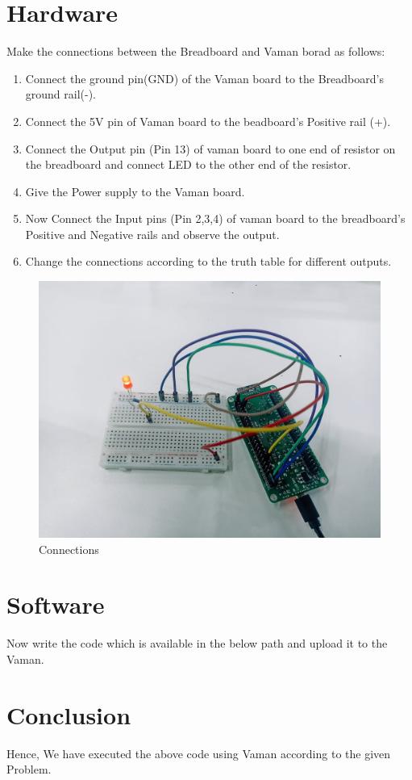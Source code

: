 \documentclass[10pt,a4paper]{article}
\begin{document}
    \section{Hardware}
    Make the connections between the Breadboard and Vaman borad as follows:
    \begin{enumerate}
    	\item Connect the ground pin(GND) of the Vaman board to the Breadboard's ground rail(-).
 	\item Connect the 5V pin of Vaman board to the beadboard's Positive rail (+).
    	\item Connect the Output pin (Pin 13) of vaman board to one end of resistor on the breadboard and connect LED to the other end of the resistor.
    	\item Give the Power supply to the Vaman board.
    	\item Now Connect the Input pins (Pin 2,3,4) of vaman board to the breadboard's Positive and Negative rails and observe the output.
    	\item Change the connections according to the truth table for different outputs.
    \end{enumerate}
	    \begin{figure}[H]
		    \centering
		    \includegraphics[width=0.3\columnwidth]{iot.jpg}
		    \caption{Connections}
		    \label{fig:connections}
	    \end{figure}
\section{Software}
	Now write the code which is available in the below path and upload it to the Vaman. \\
\section{Conclusion}
	Hence, We have executed the above code using Vaman according to the given Problem. 
\end{document}
